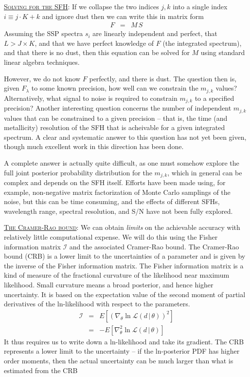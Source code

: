 \documentclass{article}
\newcommand{\given}{\,|\,}
\begin{document}
\vspace{0.15in}

\underline{\textsc{Solving for the SFH}}:
If we collapse the two indices $j, k$ into a single index $i \equiv j\cdot K + k$ and ignore dust then we can write this in matrix form
\begin{eqnarray}
F & = & M \, S
\end{eqnarray}
Assuming the SSP spectra $s_{i}$ are linearly independent and perfect, that $L > J\times K$, and that we have perfect knowledge of $F$ (the integrated spectrum), and that there is no dust, 
then this equation can be solved for $M$ using standard linear algebra techniques.

However, we do not know $F$ perfectly, and there is dust. 
The question then is, given $F_\lambda$ to some known precision, how well can we constrain the $m_{j,k}$ values? 
Alternatively, what signal to noise is required to constrain $m_{j,k}$ to a specified precision?
Another interesting question concerns the number of independent $m_{j,k}$ values that can be constrained to a given precision -- 
that is, the time (and metallicity) resolution of the SFH that is acheivable for a given integrated spectrum.
A clear and systematic answer to this question has not yet been given, though much excellent work in this direction has been done.

A complete answer is actually quite difficult, as one must somehow explore the full joint posterior probability distribution for the $m_{j,k}$, 
which in general can be complex and depends on the SFH itself.
Efforts have been made using, for example, non-negative matrix factorization of Monte Carlo samplings of the noise, 
but this can be time consuming, and the effects of different SFHs, wavelength range, spectral resolution, and S/N have not been fully explored.

\vspace{0.15in}

\underline{\textsc{The Cramer-Rao bound}}:
We can obtain \emph{limits} on the achievable accuracy with relatively little computational expense.
We will do this using the Fisher information matrix $\mathcal{I}$ and the associated Cramer-Rao bound.
The Cramer-Rao bound (CRB) is a lower limit to the uncertainties of a parameter and is given by the inverse of the Fisher information matrix.
The Fisher information matrix is a kind of measure of the fractional curvature of the likelihood near maximum likelihood. 
Small curvature means a broad posterior, and hence higher uncertainty.
It is based on the  expectation value of the second moment of partial derivatives of the ln-likelihood with respect to the parameters.
\begin{eqnarray}
\mathcal{I} & = & E\left[\left(\nabla_\theta \ln \mathcal{L}(d \given \theta)\right)^2\right] \\
 & = & -E\left[\nabla^2_\theta \ln \mathcal{L}(d \given \theta)\right]
\end{eqnarray}
It thus requires us to write down a ln-likelihood and take its gradient.
The CRB represents a lower limit to the uncertainty -- 
if the ln-posterior PDF has higher order moments, then the actual uncertainty can be much larger than what is estimated from the CRB
\end{document}
